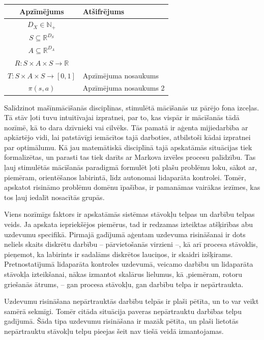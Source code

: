 \documentclass{ludis} %
\begin{document}
\tableofcontents

\setlength\LTleft{0pt}
\setlength\LTright{0pt}
\begin{longtable}{| c | p{28em} |}
  \hline
  \textbf{Apzīmējums} & \textbf{Atšifrējums}\\ 
  \endhead

  \hline
  $D_X \in \mathbb{N}_+$ & \\ %
  $S \subseteq \mathbb{R}^{D_S}$ & \\
  $A \subseteq \mathbb{R}^{D_A}$ & \\
  $R:S \times A \times S \rightarrow \mathbb{R}$ & \\
  $T:S \times A \times S \rightarrow [0,1]$ & Apzīmējuma nosaukums \\
  $\pi(s, a)$ &  Apzīmējuma nosaukums 2\\
  \hline
\end{longtable}

Salīdzinot mašīnmācīšanās disciplīnas, stimulētā mācīšanās uz pārējo fona izceļas.
Tā stāv ļoti tuvu intuitīvajai izpratnei, par to, kas vispār ir mācīšanās tādā nozīmē, kā to dara dzīvnieki vai cilvēks.
Tās pamatā ir aģenta mijiedarbība ar apkārtējo vidi, lai patstāvīgi iemācītos tajā darboties, atbilstoši kādai izpratnei par optimālumu.
Kā jau matemātiskā disciplīnā tajā apskatāmās situācijas tiek formalizētas, un parasti tas tiek darīts ar Markova izvēles procesu palīdzību.
Tas ļauj stimulētās mācīšanās paradigmā formulēt ļoti plašu problēmu loku, sākot ar, piemēram, orientēšanos labirintā, līdz autonomai lidaparāta kontrolei.
Tomēr, apskatot risināmo problēmu domēnu īpašības, ir pamanāmas vairākas iezīmes, kas tos ļauj iedalīt nosacītās grupās.

Viens nozīmīgs faktors ir apskatāmās sistēmas stāvokļu telpas un darbību telpas veids.
Ja apskata iepriekšējos piemērus, tad ir redzamas izteiktas atšķirības abu uzdevumu specifikā.
Pirmajā gadījumā aģentam uzdevuma risināšanai ir dots neliels skaits diskrētu darbību -- pārvietošanās virzieni --, kā arī procesa stāvoklis, pieņemot, ka labirints ir sadalāms diskrētos lauciņos, ir skaidri izšķirams.
Pretnostatījumā lidaparāta kontroles uzdevumā, veicamo darbību un lidaparāta stāvokļa izteikšanai, nākas izmantot skalārus lielumus, kā ,piemēram, rotoru griešanās ātrums, -- gan procesa stāvokļu, gan darbību telpa ir nepārtraukta. %

Uzdevumu risināšana nepārtrauktās darbību telpās ir plaši pētīta, un to var veikt samērā sekmīgi.
Tomēr citāda situācija paveras nepārtrauktu darbības telpu gadījumā.
Šāda tipa uzdevumu risināšana ir mazāk pētīta, un plaši lietotās nepārtrauktu stāvokļu telpu pieejas šeit nav tiešā veidā izmantojamas.
\end{document}
